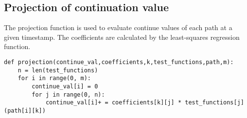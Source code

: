 \documentclass[11pt, oneside]{article}   	%
\begin{document}
\subsection{Projection of continuation value}
The projection function is used to evaluate continue values of each path at a given timestamp. The coefficients are calculated by the least-squares regression function.
\lstset{language=Python}
\lstset{frame=lines}
\lstset{basicstyle=\footnotesize}
\begin{lstlisting}
def projection(continue_val,coefficients,k,test_functions,path,m):
    n = len(test_functions)
    for i in range(0, m):
        continue_val[i] = 0
        for j in range(0, n):
            continue_val[i]+ = coefficients[k][j] * test_functions[j](path[i][k])
\end{lstlisting}
\end{document}
